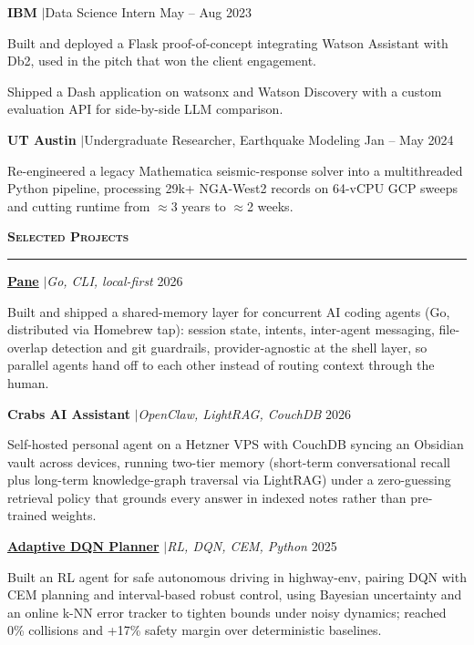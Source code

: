 \documentclass[letterpaper,10.5pt]{article}
\renewcommand{\section}[1]{%
  \vspace{0.5em}%
  {\normalsize\bfseries\scshape #1}%
  \vspace{-0.5em}%
  \par\noindent\rule{\textwidth}{0.4pt}%
  \vspace{0.15em}%
}
\let\olditemize\itemize
\let\oldenditemize\enditemize
\renewenvironment{itemize}{%
  \olditemize
  \setlength{\itemsep}{1pt}%
  \setlength{\parskip}{0pt}%
  \setlength{\parsep}{0pt}%
  \setlength{\topsep}{1.5pt}%
  \setlength{\leftmargin}{1.2em}%
}{\oldenditemize}
\begin{document}
{\textbf{IBM} \enspace$\vert$\enspace Data Science Intern \hfill May -- Aug 2023
\begin{itemize}
  \item Built and deployed a Flask proof-of-concept integrating Watson Assistant with Db2, used in the pitch that won the client engagement.
  \item Shipped a Dash application on watsonx and Watson Discovery with a custom evaluation API for side-by-side LLM comparison.
\end{itemize}

\textbf{UT Austin} \enspace$\vert$\enspace Undergraduate Researcher, Earthquake Modeling \hfill Jan -- May 2024
\begin{itemize}
  \item Re-engineered a legacy Mathematica seismic-response solver into a multithreaded Python pipeline, processing 29k+ NGA-West2 records on 64-vCPU GCP sweeps and cutting runtime from $\approx$3 years to $\approx$2 weeks.
\end{itemize}
}

\section{Selected Projects}

{\small
\textbf{\href{https://github.com/juliancanaless/pane}{Pane}} \enspace$\vert$\enspace \textit{Go, CLI, local-first} \hfill 2026
\begin{itemize}
  \item Built and shipped a shared-memory layer for concurrent AI coding agents (Go, distributed via Homebrew tap): session state, intents, inter-agent messaging, file-overlap detection and git guardrails, provider-agnostic at the shell layer, so parallel agents hand off to each other instead of routing context through the human.
\end{itemize}

\textbf{Crabs AI Assistant} \enspace$\vert$\enspace \textit{OpenClaw, LightRAG, CouchDB} \hfill 2026
\begin{itemize}
  \item Self-hosted personal agent on a Hetzner VPS with CouchDB syncing an Obsidian vault across devices, running two-tier memory (short-term conversational recall plus long-term knowledge-graph traversal via LightRAG) under a zero-guessing retrieval policy that grounds every answer in indexed notes rather than pre-trained weights.
\end{itemize}

\textbf{\href{https://github.com/juliancanaless/adaptive-dqn-autonomous-driving}{Adaptive DQN Planner}} \enspace$\vert$\enspace \textit{RL, DQN, CEM, Python} \hfill 2025
\begin{itemize}
  \item Built an RL agent for safe autonomous driving in highway-env, pairing DQN with CEM planning and interval-based robust control, using Bayesian uncertainty and an online k-NN error tracker to tighten bounds under noisy dynamics; reached 0\% collisions and +17\% safety margin over deterministic baselines.
\end{itemize}
}
\end{document}
